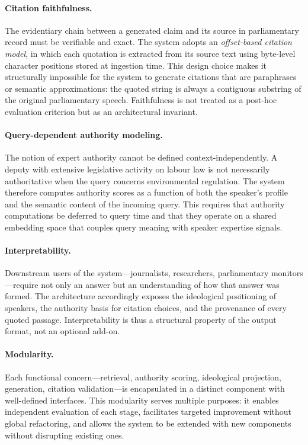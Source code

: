 \paragraph{Citation faithfulness.}
The evidentiary chain between a generated claim and its source in parliamentary record must
be verifiable and exact. The system adopts an \textit{offset-based citation model}, in
which each quotation is extracted from its source text using byte-level character positions
stored at ingestion time. This design choice makes it structurally impossible for the
system to generate citations that are paraphrases or semantic approximations: the quoted
string is always a contiguous substring of the original parliamentary speech. Faithfulness
is not treated as a post-hoc evaluation criterion but as an architectural invariant.

\paragraph{Query-dependent authority modeling.}
The notion of expert authority cannot be defined context-independently. A deputy with
extensive legislative activity on labour law is not necessarily authoritative when the
query concerns environmental regulation. The system therefore computes authority scores
as a function of both the speaker's profile and the semantic content of the incoming query.
This requires that authority computations be deferred to query time and that they operate
on a shared embedding space that couples query meaning with speaker expertise signals.

\paragraph{Interpretability.}
Downstream users of the system---journalists, researchers, parliamentary monitors---require
not only an answer but an understanding of how that answer was formed. The architecture
accordingly exposes the ideological positioning of speakers, the authority basis for
citation choices, and the provenance of every quoted passage. Interpretability is thus a
structural property of the output format, not an optional add-on.

\paragraph{Modularity.}
Each functional concern---retrieval, authority scoring, ideological projection, generation,
citation validation---is encapsulated in a distinct component with well-defined interfaces.
This modularity serves multiple purposes: it enables independent evaluation of each stage,
facilitates targeted improvement without global refactoring, and allows the system to be
extended with new components without disrupting existing ones.


